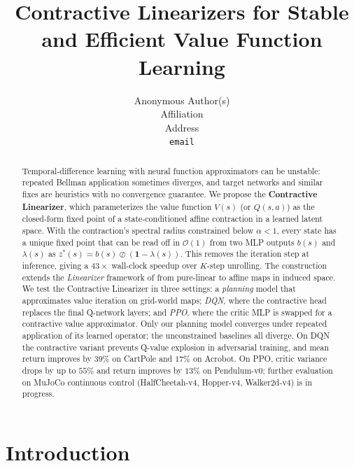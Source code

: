\documentclass{article}
\title{Contractive Linearizers for Stable and Efficient Value Function Learning}
\author{%
  Anonymous Author(s) \\
  Affiliation \\
  Address \\
  \texttt{email}
}
\newcommand{\zstar}{z^*}                     %
\newcommand{\spb}{\alpha}                    %
\newcommand{\eigs}{\lambda}                  %
\begin{document}
\maketitle

\begin{abstract}

Temporal-difference learning with neural function approximators can be
unstable: repeated Bellman application sometimes diverges, and target
networks and similar fixes are heuristics with no convergence guarantee.
We propose the \textbf{Contractive Linearizer}, which parameterizes the value
function $V(s)$ (or $Q(s,a)$) as the closed-form fixed point of a
state-conditioned affine contraction in a learned latent space.
With the contraction's spectral radius constrained below $\spb < 1$, every
state has a unique fixed point that can be read off in $\mathcal{O}(1)$ from
two MLP outputs $b(s)$ and $\eigs(s)$ as
$\zstar(s) = b(s) \oslash (\mathbf{1}-\eigs(s))$.
This removes the iteration step at inference, giving a $43\times$
wall-clock speedup over $K$-step unrolling.
The construction extends the \emph{Linearizer} framework of
\citet{anonymous2026linearizer} from pure-linear to affine maps in induced
space.
We test the Contractive Linearizer in three settings: a \emph{planning}
model that approximates value iteration on grid-world maps;
\emph{DQN}, where the contractive head replaces the final Q-network layers;
and \emph{PPO}, where the critic MLP is swapped for a contractive value
approximator.
Only our planning model converges under repeated application of its learned
operator; the unconstrained baselines all diverge.
On DQN the contractive variant prevents Q-value explosion in adversarial
training, and mean return improves by $39\%$ on CartPole and $17\%$ on Acrobot.
On PPO, critic variance drops by up to $55\%$ and return improves by $13\%$
on Pendulum-v0; further evaluation on MuJoCo continuous control
(HalfCheetah-v4, Hopper-v4, Walker2d-v4) is in progress.

\end{abstract}

\section{Introduction}
\label{sec:intro}
\end{document}
